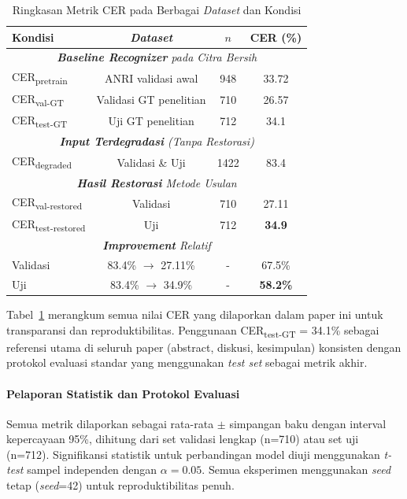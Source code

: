 \documentclass[journal]{IEEEtran}
\begin{document}
\begin{table}[!ht]
\centering
\caption{Ringkasan Metrik CER pada Berbagai \textit{Dataset} dan Kondisi}
\label{table:cer_summary}
\small
\begin{tabular}{|l|c|c|c|}
\hline
\textbf{Kondisi} & \textbf{\textit{Dataset}} & \textbf{$n$} & \textbf{CER (\%)} \\
\hline
\multicolumn{4}{|c|}{\textit{\textbf{Baseline Recognizer} pada Citra Bersih}} \\
\hline
CER\textsubscript{pretrain} & ANRI validasi awal & 948 & 33.72 \\
CER\textsubscript{val-GT} & Validasi GT penelitian & 710 & 26.57 \\
CER\textsubscript{test-GT} & Uji GT penelitian & 712 & 34.1 \\
\hline
\multicolumn{4}{|c|}{\textit{\textbf{Input Terdegradasi} (Tanpa Restorasi)}} \\
\hline
CER\textsubscript{degraded} & Validasi \& Uji & 1422 & 83.4 \\
\hline
\multicolumn{4}{|c|}{\textit{\textbf{Hasil Restorasi} Metode Usulan}} \\
\hline
CER\textsubscript{val-restored} & Validasi & 710 & 27.11 \\
CER\textsubscript{test-restored} & Uji & 712 & \textbf{34.9} \\
\hline
\multicolumn{4}{|c|}{\textit{\textbf{Improvement} Relatif}} \\
\hline
Validasi & 83.4\% $\rightarrow$ 27.11\% & - & 67.5\% \\
Uji & 83.4\% $\rightarrow$ 34.9\% & - & \textbf{58.2\%} \\
\hline
\end{tabular}
\end{table}

Tabel~\ref{table:cer_summary} merangkum semua nilai CER yang dilaporkan dalam paper ini untuk transparansi dan reproduktibilitas. Penggunaan CER\textsubscript{test-GT} = 34.1\% sebagai referensi utama di seluruh paper (abstract, diskusi, kesimpulan) konsisten dengan protokol evaluasi standar yang menggunakan \textit{test set} sebagai metrik akhir.

\paragraph{Pelaporan Statistik dan Protokol Evaluasi}

Semua metrik dilaporkan sebagai rata-rata $\pm$ simpangan baku dengan interval kepercayaan 95\%, dihitung dari set validasi lengkap (n=710) atau set uji (n=712). Signifikansi statistik untuk perbandingan model diuji menggunakan \textit{t-test} sampel independen dengan $\alpha = 0.05$. Semua eksperimen menggunakan \textit{seed} tetap (\textit{seed}=42) untuk reproduktibilitas penuh.
\end{document}
